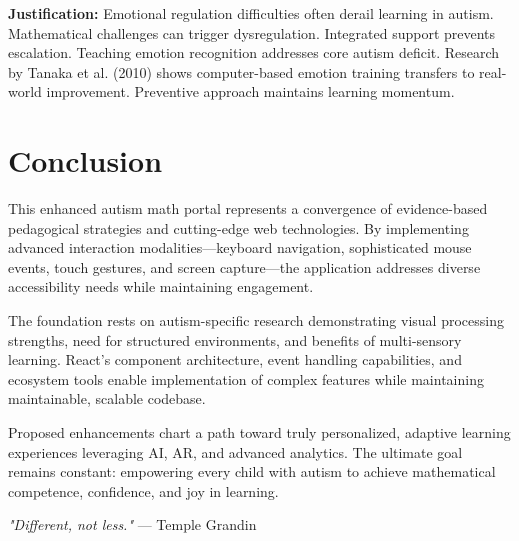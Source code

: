 \documentclass[11pt, a4paper]{article}
\begin{document}
\textbf{Justification:} Emotional regulation difficulties often derail learning in autism. Mathematical challenges can trigger dysregulation. Integrated support prevents escalation. Teaching emotion recognition addresses core autism deficit. Research by Tanaka et al. (2010) shows computer-based emotion training transfers to real-world improvement. Preventive approach maintains learning momentum.

\section*{Conclusion}

This enhanced autism math portal represents a convergence of evidence-based pedagogical strategies and cutting-edge web technologies. By implementing advanced interaction modalities—keyboard navigation, sophisticated mouse events, touch gestures, and screen capture—the application addresses diverse accessibility needs while maintaining engagement.

The foundation rests on autism-specific research demonstrating visual processing strengths, need for structured environments, and benefits of multi-sensory learning. React's component architecture, event handling capabilities, and ecosystem tools enable implementation of complex features while maintaining maintainable, scalable codebase.

Proposed enhancements chart a path toward truly personalized, adaptive learning experiences leveraging AI, AR, and advanced analytics. The ultimate goal remains constant: empowering every child with autism to achieve mathematical competence, confidence, and joy in learning.

\vspace{1cm}
\begin{center}
\textit{"Different, not less."} — Temple Grandin
\end{center}
\end{document}
